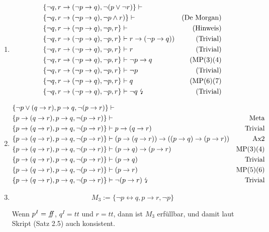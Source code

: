 \begin{enumerate}

\item \begin{align}
	& \{\lnot q, r \to (\lnot p \to q), \lnot (p \lor \lnot r)\} \vdash \\	
	& \{\lnot q, r \to (\lnot p \to q), \lnot p \land r)\} \vdash & \text{(De Morgan)} \\
	& \{\lnot q, r \to (\lnot p \to q),\lnot p, r\} \vdash & \text{(Hinweis)} \\
	& \{\lnot q, r \to (\lnot p \to q),\lnot p, r\} \vdash r \to (\lnot p \to q)) & \text{(Trivial)} \\
	& \{\lnot q, r \to (\lnot p \to q),\lnot p, r\} \vdash r & \text{(Trivial)} \\
	& \{\lnot q, r \to (\lnot p \to q),\lnot p, r\} \vdash \lnot p \to q & \text{(MP(3)(4)} \\
	& \{\lnot q, r \to (\lnot p \to q),\lnot p, r\} \vdash \lnot p & \text{(Trivial)} \\
	& \{\lnot q, r \to (\lnot p \to q),\lnot p, r\} \vdash q & \text{(MP(6)(7)} \\
	& \{\lnot q, r \to (\lnot p \to q),\lnot p, r\} \vdash \lnot q \text{ \lightning}  & \text{(Trivial)} 
\end{align}

\item \begin{align}
	& \{\lnot p \lor (q \to r),  p \to q, \lnot (p \to r)\} \vdash \\
	& \{p \to (q \to r),  p \to q, \lnot (p \to r)\} \vdash & \text{Meta}\\
	& \{p \to (q \to r),  p \to q, \lnot (p \to r)\} \vdash p \to (q \to r) & \text{Trivial}\\
	& \{p \to (q \to r),  p \to q, \lnot (p \to r)\} \vdash (p \to (q \to r)) \to ((p \to q) \to (p \to r)) & \text{Ax2}\\
	& \{p \to (q \to r),  p \to q, \lnot (p \to r)\} \vdash (p \to q) \to (p \to r) & \text{MP(3)(4)}\\
	& \{p \to (q \to r),  p \to q, \lnot (p \to r)\} \vdash (p \to q) & \text{Trivial}\\
	& \{p \to (q \to r),  p \to q, \lnot (p \to r)\} \vdash (p \to r) & \text{MP(5)(6)}\\
	& \{p \to (q \to r),  p \to q, \lnot (p \to r)\} \vdash \lnot (p \to r) \text{ \lightning}& \text{Trivial}
\end{align}

\item $$ M_3 := \{\lnot p \leftrightarrow q, p \to r, \lnot p\} $$

Wenn $p^I = f\!\! f$, $q^I=tt$ und $r=tt$, dann ist $M_3$ erfüllbar, und damit laut Skript (Satz 2.5) auch konsistent.

\end{enumerate}


\vfill\centering

